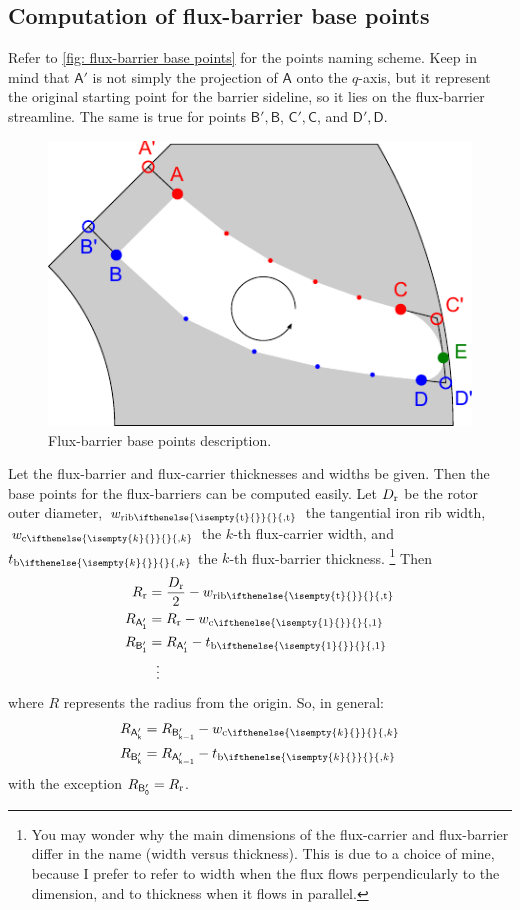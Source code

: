 \documentclass[b5paper,11pt,oneside,fleqn]{article}
\newcommand{\ped}[1]{_\textup{#1}}
\newcommand{\pt}[1]{\mathsf{#1}}
\newcommand{\wc}[1][]{%
w_{\textup{c}
\ifthenelse{\isempty{#1}{}}{}{,#1}%
}}
\newcommand{\tb}[1][]{%
t_{\textup{b}
\ifthenelse{\isempty{#1}{}}{}{,#1}%
}}
\newcommand{\wrib}[1][]{%
w_{\textup{rib}
\ifthenelse{\isempty{#1}{}}{}{,#1}%
}}
\newcommand{\wribt}{\wrib[\text{t}]}
\newcommand{\xth}[1]{$ #1 $-th}
\begin{document}
\subsection{Computation of flux-barrier base points}

Refer to \autoref{fig: flux-barrier base points} for the points naming scheme.
Keep in mind that $ \pt{A}' $ is not simply the projection of $ \pt{A} $ onto 
the $ q $-axis, but it represent the original starting point for the barrier 
sideline, so it lies on the flux-barrier streamline. The same is true for 
points
$ \pt{B}',\pt{B} $, 
$ \pt{C}',\pt{C} $, and
$ \pt{D}',\pt{D} $.

\begin{figure}[tb]
\centering
\includegraphics[width=0.75\linewidth]{gfx/BarrierPoints/BarrierPoints}
\caption{Flux-barrier base points description.}
\label{fig: flux-barrier base points}
\end{figure}

Let the flux-barrier and flux-carrier thicknesses and widths be given.
Then the base points for the flux-barriers can be computed easily.
Let
$ D\ped{r} $ be the rotor outer diameter,
$ \wribt $ the tangential iron rib width,
$ \wc[k] $ the \xth{k} flux-carrier width,
and $ \tb[k] $ the \xth{k} flux-barrier thickness.%
\footnote{%
You may wonder why the main dimensions of the flux-carrier and
flux-barrier differ in the name (width versus thickness).
This is due to a choice of mine,
because I prefer to refer to width when the flux flows perpendicularly to the
dimension,
and to thickness when it flows in parallel.%
}
%
Then
\begin{equation}
\begin{aligned}
R\ped{r} &= \frac{D\ped{r}}{2} - \wribt \\
R_\pt{A_1'} &= R\ped{r} - \wc[1] \\
R_\pt{B_1'} &= R_\pt{A_1'} - \tb[1] \\
    &\:\:\,\vdots
\end{aligned}
\end{equation}
where $ R $ represents the radius from the origin.
%
So, in general:
\begin{equation}
\begin{aligned}
R_\pt{A_k'} &= R_\pt{B_{k-1}'} - \wc[k] \\
R_\pt{B_k'} &= R_\pt{A_{k-1}'} - \tb[k]
\end{aligned}
\end{equation}
with the exception $ R_\pt{B_0'} = R\ped{r} $.
\end{document}
